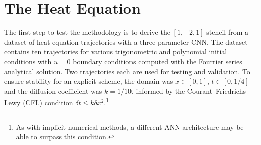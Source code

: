 \documentclass{article}
\begin{document}






\section{The Heat Equation}

The first step to test the methodology is to derive the $[1,-2,1]$
stencil from a dataset of heat equation trajectories with a three-parameter CNN.
The dataset contains ten trajectories for various trigonometric and polynomial
initial conditions with $u=0$ boundary conditions computed with the
Fourrier series analytical solution. Two trajectories each are used for
testing and validation.
To ensure stability for an explicit scheme, the domain was $x\in[0,1]$,
$t\in[0,1/4]$ and the diffusion coefficient was
$k=1/10$, informed by the Courant–Friedrichs–Lewy (CFL) condition $\delta t\leq k \delta
x^2$\citep{leveque_finite_2007}.\footnote{As with implicit numerical methods, a
  different ANN architecture may be able to surpass this condition.}
\end{document}
